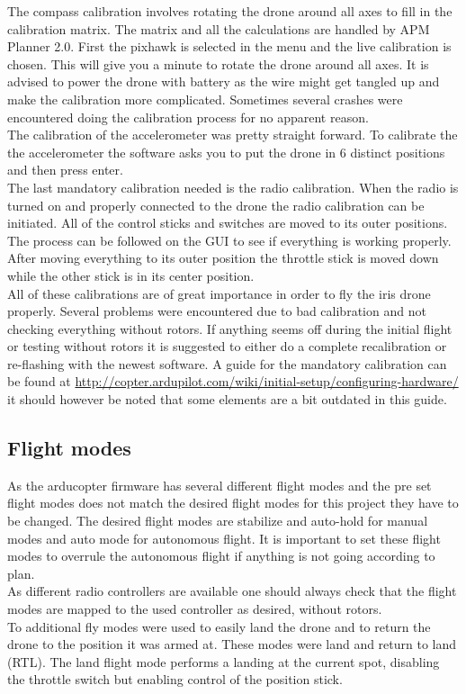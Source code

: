 The compass calibration involves rotating the drone around all axes to fill in the calibration matrix. The matrix and all the calculations are handled by APM Planner 2.0. First the pixhawk is selected in the menu and the live calibration is chosen. This will give you a minute to rotate the drone around all axes. It is advised to power the drone with battery as the wire might get tangled up and make the calibration more complicated. Sometimes several crashes were encountered doing the calibration process for no apparent reason.\\

The calibration of the accelerometer was pretty straight forward. To calibrate the the accelerometer the software asks you to put the drone in 6 distinct positions and then press enter.\\

The last mandatory calibration needed is the radio calibration. When the radio is turned on and properly connected to the drone the radio calibration can be initiated. All of the control sticks and switches are moved to its outer positions.  The process can be followed on the GUI to see if everything is working properly. After moving everything to its outer position the throttle stick is moved down while the other stick is in its center position.\\

All of these calibrations are of great importance in order to fly the iris drone properly. Several problems were encountered due to bad calibration and not checking everything without rotors. If anything seems off during the initial flight or testing without rotors it is suggested to either do a complete recalibration or re-flashing with the newest software. A guide for the mandatory calibration can be found at \url{http://copter.ardupilot.com/wiki/initial-setup/configuring-hardware/} it should however be noted that some elements are a bit outdated in this guide.

\subsection*{Flight modes}
As the arducopter firmware has several different flight modes and the pre set flight modes does not match the desired flight modes for this project they have to be changed. The desired flight modes are stabilize and auto-hold for manual modes and auto mode for autonomous flight. It is important to set these flight modes to overrule the autonomous flight if anything is not going according to plan.\\
As different radio controllers are available one should always check that the flight modes are mapped to the used controller as desired, without rotors.\\
To additional fly modes were used to easily land the drone and to return the drone to the position it was armed at. These modes were land and return to land (RTL). The land flight mode performs a landing at the current spot, disabling the throttle switch but enabling control of the position stick.\\

